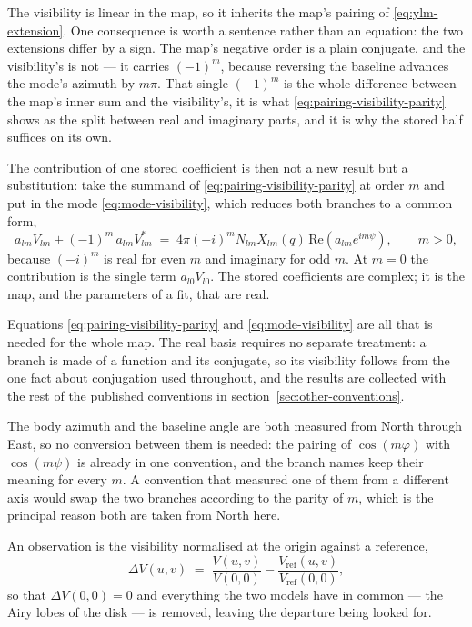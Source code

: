 The visibility is linear in the map, so it inherits the map's pairing of \eqref{eq:ylm-extension}.
One consequence is worth a sentence rather than an equation: the two extensions differ by a
sign.  The map's negative order is a plain conjugate, and the visibility's is not --- it carries
$(-1)^m$, because reversing the baseline advances the mode's azimuth by $m\pi$.  That single
$(-1)^m$ is the whole difference between the map's inner sum and the visibility's, it is what
\eqref{eq:pairing-visibility-parity} shows as the split between real and imaginary parts, and it
is why the stored half suffices on its own.

The contribution of one stored coefficient is then not a new result but a substitution: take the
summand of \eqref{eq:pairing-visibility-parity} at order $m$ and put in the mode
\eqref{eq:mode-visibility}, which reduces both branches to a common form,
\[
  a_{lm}V_{lm} + (-1)^m\,a_{lm}V_{lm}^*
  \;=\; 4\pi(-i)^m N_{lm} X_{lm}(q)\, \mathrm{Re}\!\left(a_{lm} e^{im\psi}\right) ,
  \qquad m > 0 ,
\]
because $(-i)^m$ is real for even $m$ and imaginary for odd $m$.  At $m = 0$ the contribution is
the single term $a_{l0}V_{l0}$.  The stored coefficients are complex; it is the map, and the
parameters of a fit, that are real.

Equations \eqref{eq:pairing-visibility-parity} and \eqref{eq:mode-visibility} are all that is
needed for the whole map.  The real basis requires no separate treatment: a branch is made of a
function and its conjugate, so its visibility follows from the one fact about conjugation used
throughout, and the results are collected with the rest of the published conventions in
section~\ref{sec:other-conventions}.

The body azimuth and the baseline angle are both measured from North through East, so
no conversion between them is needed: the pairing of $\cos(m\varphi)$ with $\cos(m\psi)$ is
already in one convention, and the branch names keep their meaning for every $m$.  A
convention that measured one of them from a different axis would swap the two branches
according to the parity of $m$, which is the principal reason both are taken from North
here.

An observation is the visibility normalised at the origin against a reference,
\begin{equation}
  \Delta V(u,v) \;=\; \frac{V(u,v)}{V(0,0)} - \frac{V_\text{ref}(u,v)}{V_\text{ref}(0,0)} ,
  \label{eq:normalised-visibility}
\end{equation}
so that $\Delta V(0,0) = 0$ and everything the two models have in common --- the Airy lobes
of the disk --- is removed, leaving the departure being looked for.

